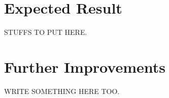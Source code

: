 \section{Expected Result}

STUFFS TO PUT HERE.

\section{Further Improvements}

WRITE SOMETHING HERE TOO.
